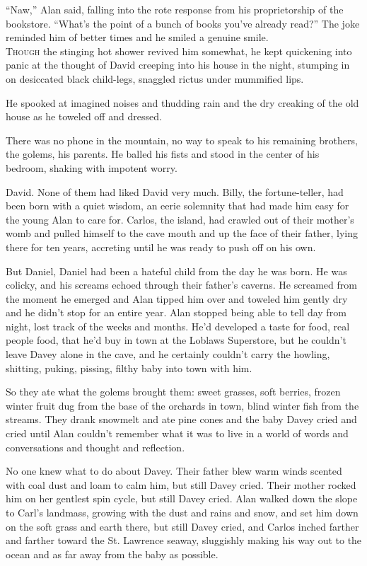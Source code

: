 ``Naw,'' Alan said, falling into the rote response from his
proprietorship of the bookstore.  ``What's the point of a bunch of
books you've already read?'' The joke reminded him of better times and
he smiled a genuine smile.
\\
\lettrine[lines=3, lhang=.5, nindent=0pt, findent=2pt]{T}{hough} the stinging hot shower revived him somewhat, he kept
quickening into panic at the thought of David creeping into his house
in the night, stumping in on desiccated black child-legs, snaggled
rictus under mummified lips.

He spooked at imagined noises and thudding rain and the dry creaking
of the old house as he toweled off and dressed.

There was no phone in the mountain, no way to speak to his remaining
brothers, the golems, his parents.  He balled his fists and stood in
the center of his bedroom, shaking with impotent worry.

David.  None of them had liked David very much.  Billy, the
fortune-teller, had been born with a quiet wisdom, an eerie solemnity
that had made him easy for the young Alan to care for.  Carlos, the
island, had crawled out of their mother's womb and pulled himself to
the cave mouth and up the face of their father, lying there for ten
years, accreting until he was ready to push off on his own.

But Daniel, Daniel had been a hateful child from the day he was born. 
He was colicky, and his screams echoed through their father's caverns. 
He screamed from the moment he emerged and Alan tipped him over and
toweled him gently dry and he didn't stop for an entire year.  Alan
stopped being able to tell day from night, lost track of the weeks and
months.  He'd developed a taste for food, real people food, that he'd
buy in town at the Loblaws Superstore, but he couldn't leave Davey
alone in the cave, and he certainly couldn't carry the howling,
shitting, puking, pissing, filthy baby into town with him.

So they ate what the golems brought them:  sweet grasses, soft
berries, frozen winter fruit dug from the base of the orchards in
town, blind winter fish from the streams.  They drank snowmelt and ate
pine cones and the baby Davey cried and cried until Alan couldn't
remember what it was to live in a world of words and conversations and
thought and reflection.

No one knew what to do about Davey.  Their father blew warm winds
scented with coal dust and loam to calm him, but still Davey cried. 
Their mother rocked him on her gentlest spin cycle, but still Davey
cried.  Alan walked down the slope to Carl's landmass, growing with
the dust and rains and snow, and set him down on the soft grass and
earth there, but still Davey cried, and Carlos inched farther and
farther toward the St.  Lawrence seaway, sluggishly making his way out
to the ocean and as far away from the baby as possible.

